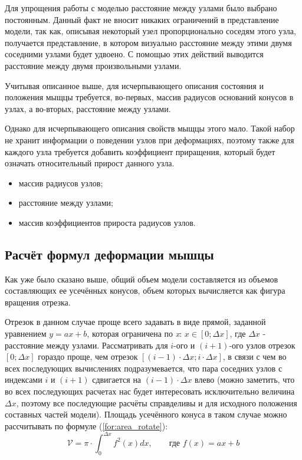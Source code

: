 Для упрощения работы с моделью расстояние между узлами было выбрано постоянным. Данный факт не вносит никаких ограничений в представление модели, так как, описывая некоторый узел пропорционально соседям этого узла, получается представление, в котором визуально расстояние между этими двумя соседними узлами будет удвоено. С помощью этих действий выводится расстояние между двумя произвольными узлами.

Учитывая описанное выше, для исчерпывающего описания состояния и положения мыщцы требуется, во-первых, массив радиусов оснований конусов в узлах, а во-вторых, расстояние между узлами.

Однако для исчерпывающего описания свойств мыщцы этого мало. Такой набор не хранит информации о поведении узлов при деформациях, поэтому также для каждого узла требуется добавить коэффициент приращения, который будет означать относительный прирост данного узла.
\begin{itemize}
    \item массив радиусов узлов;
    \item расстояние между узлами;
    \item массив коэффициентов прироста радиусов узлов.
\end{itemize}

\subsection{Расчёт формул деформации мышцы}

Как уже было сказано выше, общий объем модели составляется из объемов составляющих ее усечённых конусов, объем которых вычисляется как фигура вращения отрезка. 

Отрезок в данном случае проще всего задавать в виде прямой, заданной уравнением $ y = ax + b $, которая ограничена по \textit{x}: $x \in [0; \Delta x]$, где $\Delta x$ - расстояние между узлами. Рассматривать для $i$-ого и $(i + 1)$-ого узлов отрезок $[0; \Delta x]$ гораздо проще, чем отрезок $[(i - 1) \cdot \Delta x; i \cdot \Delta x]$, в связи с чем во всех последующих вычислениях подразумевается, что пара соседних узлов с индексами $i$ и $(i + 1)$ сдвигается на $(i - 1) \cdot \Delta x$ влево (можно заметить, что во всех последующих расчетах нас будет интересовать исключительно величина $\Delta x$, поэтому все последующие расчёты справделивы и для исходного положения составных частей модели). Площадь усечённого конуса в таком случае можно рассчитывать по формуле (\ref{for:area_rotate}):
\begin{equation}
    \label{for:area_rotate}
    \mathcal{V} = \pi \cdot \int_{0}^{\Delta x}f^2(x)dx,\qquad \text{где }f(x) = ax + b
\end{equation}


